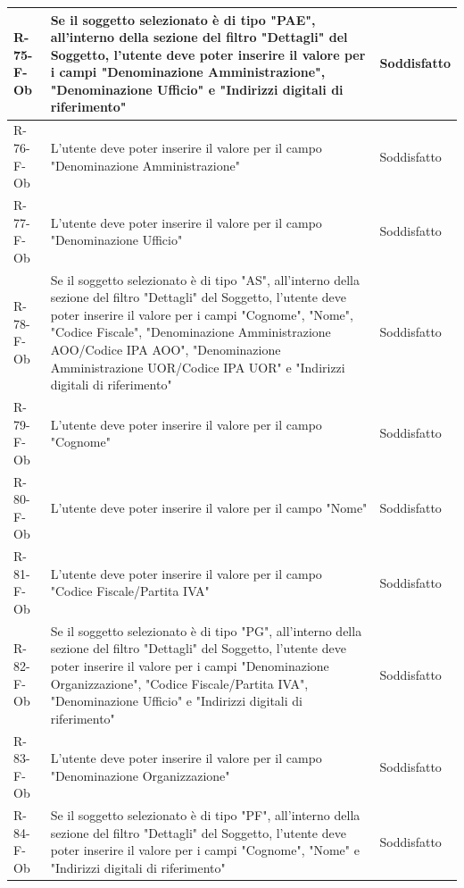 \begin{longtable}{|p{2.5cm}|p{9.5cm}|p{2.5cm}|}
\hline
R-75-F-Ob & Se il soggetto selezionato è di tipo "PAE", all'interno della sezione del filtro "Dettagli" del Soggetto, l'utente deve poter inserire il valore per i campi "Denominazione Amministrazione", "Denominazione Ufficio" e "Indirizzi digitali di riferimento" & Soddisfatto \\
\hline
R-76-F-Ob & L'utente deve poter inserire il valore per il campo "Denominazione Amministrazione" & Soddisfatto \\
\hline
R-77-F-Ob & L'utente deve poter inserire il valore per il campo "Denominazione Ufficio" & Soddisfatto \\
\hline
R-78-F-Ob & Se il soggetto selezionato è di tipo "AS", all'interno della sezione del filtro "Dettagli" del Soggetto, l'utente deve poter inserire il valore per i campi "Cognome", "Nome", "Codice Fiscale", "Denominazione Amministrazione AOO/Codice IPA AOO", "Denominazione Amministrazione UOR/Codice IPA UOR" e "Indirizzi digitali di riferimento" & Soddisfatto \\
\hline
R-79-F-Ob & L'utente deve poter inserire il valore per il campo "Cognome" & Soddisfatto \\
\hline
R-80-F-Ob & L'utente deve poter inserire il valore per il campo "Nome" & Soddisfatto \\
\hline
R-81-F-Ob & L'utente deve poter inserire il valore per il campo "Codice Fiscale/Partita IVA" & Soddisfatto \\
\hline
R-82-F-Ob & Se il soggetto selezionato è di tipo "PG", all'interno della sezione del filtro "Dettagli" del Soggetto, l'utente deve poter inserire il valore per i campi "Denominazione Organizzazione", "Codice Fiscale/Partita IVA", "Denominazione Ufficio" e "Indirizzi digitali di riferimento" & Soddisfatto \\
\hline
R-83-F-Ob & L'utente deve poter inserire il valore per il campo "Denominazione Organizzazione" & Soddisfatto \\
\hline
R-84-F-Ob & Se il soggetto selezionato è di tipo "PF", all'interno della sezione del filtro "Dettagli" del Soggetto, l'utente deve poter inserire il valore per i campi "Cognome", "Nome" e "Indirizzi digitali di riferimento" & Soddisfatto \\


\end{longtable}
